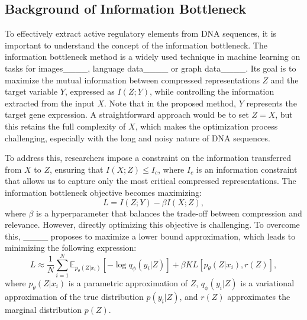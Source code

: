 

\subsection{Background of Information Bottleneck}
To effectively extract active regulatory elements from DNA sequences, it is important to understand the concept of the information bottleneck. 
The information bottleneck method is a widely used technique in machine learning on tasks for images____, language data____ or graph data____.
Its goal is to maximize the mutual information between compressed representations $Z$ and the target variable $Y$, expressed as $I(Z; Y)$, while controlling the information extracted from the input $X$. Note that in the proposed method, $Y$ represents the target gene expression.
A straightforward approach would be to set $Z = X$, but this retains the full complexity of $X$, which makes the optimization process challenging, especially with the long and noisy nature of DNA sequences. 

To address this, researchers impose a constraint on the information transferred from $X$ to $Z$, ensuring that $I(X;Z) \leq I_c$, where $I_c$ is an information constraint that allows us to capture only the most critical compressed representations. The information bottleneck objective becomes maximizing:
\begin{equation}
\label{prelim:MI}
    L = I(Z;Y) - \beta I(X;Z),
\end{equation}
where $\beta$ is a hyperparameter that balances the trade-off between compression and relevance. However, directly optimizing this objective is challenging. To overcome this, ____ proposes to maximize a lower bound approximation, which leads to minimizing the following expression:
\begin{equation}
\label{IB}
    L \approx \frac{1}{N} \sum_{i=1}^N \mathbb{E}_{p_{\theta}(Z|x_i)} [-\log q_{\phi} (y_i|Z)] + \beta KL[p_{\theta}(Z|x_i), r(Z)],
\end{equation}
where $p_{\theta}(Z|x_i)$ is a parametric approximation of $Z$, $q_{\phi}(y_i|Z)$ is a variational approximation of the true distribution $p(y_i|Z)$, and $r(Z)$ approximates the marginal distribution $p(Z)$.


